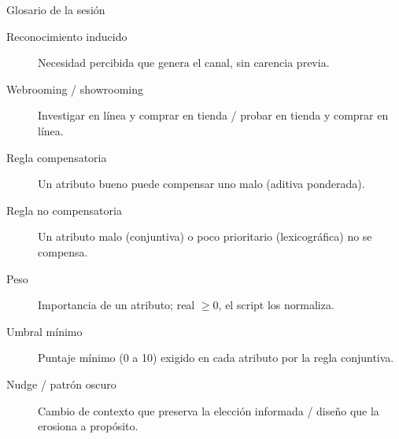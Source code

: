 \documentclass[aspectratio=169,xcolor=dvipsnames]{beamer}
\begin{document}
\begin{frame}{Glosario de la sesión}
\scriptsize
\begin{description}
  \item[Reconocimiento inducido] Necesidad percibida que genera el canal, sin carencia previa.
  \item[Webrooming / showrooming] Investigar en línea y comprar en tienda / probar en tienda y comprar en línea.
  \item[Regla compensatoria] Un atributo bueno puede compensar uno malo (aditiva ponderada).
  \item[Regla no compensatoria] Un atributo malo (conjuntiva) o poco prioritario (lexicográfica) no se compensa.
  \item[Peso] Importancia de un atributo; real $\geq 0$, el script los normaliza.
  \item[Umbral mínimo] Puntaje mínimo (0 a 10) exigido en cada atributo por la regla conjuntiva.
  \item[Nudge / patrón oscuro] Cambio de contexto que preserva la elección informada / diseño que la erosiona a propósito.
\end{description}
\end{frame}
\end{document}
